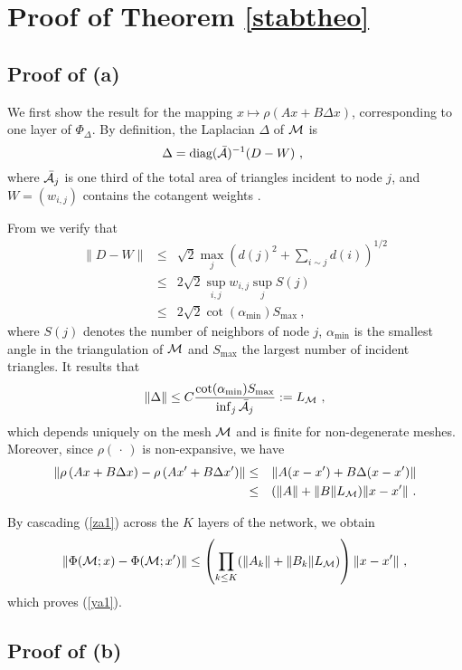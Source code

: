 \section{Proof of Theorem \ref{stabtheo}}
 
 \subsection{Proof of (a)}
 We first show the result for the mapping $x \mapsto \rho \left( A x + B \Delta x \right)$, 
 corresponding to one layer of $\Phi_\Delta$. 
 By definition, the Laplacian $\Delta$ of ${\mathcal{M}}$ is 
 $$\Delta = \text{diag}(\bar{{\mathcal A}})^{-1}( D - W)~,~$$
where $\bar{{\mathcal A}}_j$ is one third of the total area of triangles incident to node $j$, 
and $W=(w_{i,j})$ contains the cotangent  weights \cite{laplacian_conv}.

From \cite{laplace_bound} we verify that 
\begin{eqnarray}
\label{ble4}
\| D - W \| &\leq& \sqrt{2} \max_{j} \left( d(j)^2 + \sum_{i \sim j} d(i) \right)^{1/2}  \\
&\leq& 2\sqrt{2} \sup_{i,j} w_{i,j} \sup_j S(j) \nonumber \\
&\leq& 2 \sqrt{2} \cot ( \alpha_{\text{min}} ) S_{\text{max}} ~, \nonumber
\end{eqnarray}
where $S(j)$ denotes the number of neighbors of node $j$, 
$\alpha_{\text{min}}$ is the smallest angle in the triangulation of ${\mathcal{M}}$ and $S_{\text{max}}$ the 
largest number of incident triangles. 
It results that 
$$\| \Delta \| \leq C \frac{\cot ( \alpha_{\text{min}} ) S_{\text{max}}}{\inf_j \bar{{\mathcal A}}_j}:= L_{\mathcal{M}}~,$$
which depends uniquely on the mesh ${\mathcal{M}}$ and is finite for non-degenerate meshes. 
Moreover, since $\rho(\,\cdot \,)$ is non-expansive, we have
\begin{eqnarray}
\label{za1}
\left\| \rho \left( A x + B \Delta x \right) - \rho\left( A x' + B \Delta x' \right) \right \| & \leq & \| A( x - x') + B \Delta (x-x') \| \\ \nonumber
& \leq & (\| A \| + \| B \| L_{\mathcal{M}} ) \| x - x'\|~. 
\end{eqnarray}

By cascading (\ref{za1}) across the $K$ layers of the network, we obtain
\begin{equation*}
\| \Phi({\mathcal{M}}; x) - \Phi({\mathcal{M}}; x') \| \leq \left(\prod_{k \leq K} ( \| A_k \| + \| B_k \| L_{\mathcal{M}}) \right) \| x - x' \|~,
\end{equation*}
which proves (\ref{ya1}).

\subsection{Proof of (b)}

